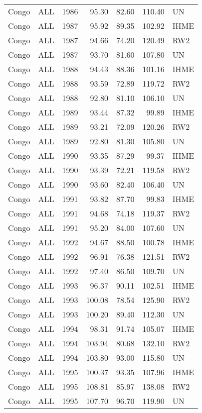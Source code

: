 \begin{longtable}{lllrrrl}
  Congo & ALL & 1986 & 95.30 & 82.60 & 110.40 & UN \\ 
  Congo & ALL & 1987 & 95.92 & 89.35 & 102.92 & IHME \\ 
  Congo & ALL & 1987 & 94.66 & 74.20 & 120.49 & RW2 \\ 
  Congo & ALL & 1987 & 93.70 & 81.60 & 107.80 & UN \\ 
  Congo & ALL & 1988 & 94.43 & 88.36 & 101.16 & IHME \\ 
  Congo & ALL & 1988 & 93.59 & 72.89 & 119.72 & RW2 \\ 
  Congo & ALL & 1988 & 92.80 & 81.10 & 106.10 & UN \\ 
  Congo & ALL & 1989 & 93.44 & 87.32 & 99.89 & IHME \\ 
  Congo & ALL & 1989 & 93.21 & 72.09 & 120.26 & RW2 \\ 
  Congo & ALL & 1989 & 92.80 & 81.30 & 105.80 & UN \\ 
  Congo & ALL & 1990 & 93.35 & 87.29 & 99.37 & IHME \\ 
  Congo & ALL & 1990 & 93.39 & 72.21 & 119.58 & RW2 \\ 
  Congo & ALL & 1990 & 93.60 & 82.40 & 106.40 & UN \\ 
  Congo & ALL & 1991 & 93.82 & 87.70 & 99.83 & IHME \\ 
  Congo & ALL & 1991 & 94.68 & 74.18 & 119.37 & RW2 \\ 
  Congo & ALL & 1991 & 95.20 & 84.00 & 107.60 & UN \\ 
  Congo & ALL & 1992 & 94.67 & 88.50 & 100.78 & IHME \\ 
  Congo & ALL & 1992 & 96.91 & 76.38 & 121.51 & RW2 \\ 
  Congo & ALL & 1992 & 97.40 & 86.50 & 109.70 & UN \\ 
  Congo & ALL & 1993 & 96.37 & 90.11 & 102.51 & IHME \\ 
  Congo & ALL & 1993 & 100.08 & 78.54 & 125.90 & RW2 \\ 
  Congo & ALL & 1993 & 100.20 & 89.40 & 112.30 & UN \\ 
  Congo & ALL & 1994 & 98.31 & 91.74 & 105.07 & IHME \\ 
  Congo & ALL & 1994 & 103.94 & 80.68 & 132.10 & RW2 \\ 
  Congo & ALL & 1994 & 103.80 & 93.00 & 115.80 & UN \\ 
  Congo & ALL & 1995 & 100.37 & 93.35 & 107.96 & IHME \\ 
  Congo & ALL & 1995 & 108.81 & 85.97 & 138.08 & RW2 \\ 
  Congo & ALL & 1995 & 107.70 & 96.70 & 119.90 & UN \\ 

\end{longtable}
